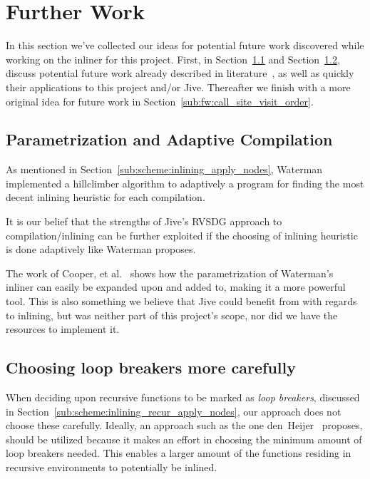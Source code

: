 
\clearpage
\section{Further Work}
\label{sec:further_work}

In this section we've collected our ideas for potential future work discovered
while working on the inliner for this project. First, in
Section~\ref{sub:fw:adaptiv_comp} and
Section~\ref{sub:fw:optimal_loop_breakers}, discuss potential future work
already described in
literature~\cite{AdaptvStratInlSubst,AdaptvCompilAndInlingWaterman,BasMscThesis}, as well as quickly their applications
to this project and/or Jive. Thereafter we finish with a more original idea for
future work in Section~\ref{sub:fw:call_site_visit_order}.

\subsection{Parametrization and Adaptive Compilation}
\label{sub:fw:adaptiv_comp}

As mentioned in Section~\ref{sub:scheme:inlining_apply_nodes},
Waterman~\cite{AdaptvCompilAndInlingWaterman} implemented a hillclimber
algorithm to adaptively  a program for finding the most
decent inlining heuristic for each compilation.

It is our belief that the strengths of Jive's RVSDG approach to
compilation/inlining can be further exploited if the choosing of inlining
heuristic is done adaptively like Waterman proposes.

The work of Cooper, et al.~\cite{AdaptvStratInlSubst} shows how the
parametrization of Waterman's~\cite{AdaptvCompilAndInlingWaterman} inliner can
easily be expanded upon and added to, making it a more powerful tool. This is
also something we believe that Jive could benefit from with regards to inlining,
but was neither part of this project's scope, nor did we have the resources to
implement it.

\subsection{Choosing loop breakers more carefully}
\label{sub:fw:optimal_loop_breakers}

When deciding upon recursive functions to be marked as \textit{loop breakers},
discussed in Section~\ref{sub:scheme:inlining_recur_apply_nodes}, our approach
does not choose these carefully. Ideally, an approach such as the one
den~Heijer~\cite{BasMscThesis} proposes, should be utilized because it makes an
effort in choosing the minimum amount of loop breakers needed. This enables a
larger amount of the functions residing in recursive environments to potentially
be inlined.

